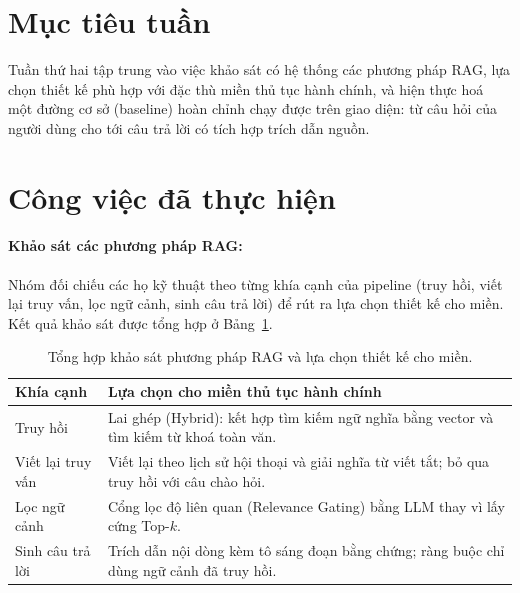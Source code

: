 \documentclass[11pt]{article}
\begin{document}

\section{Mục tiêu tuần}
Tuần thứ hai tập trung vào việc khảo sát có hệ thống các phương pháp RAG, lựa chọn thiết kế
phù hợp với đặc thù miền thủ tục hành chính, và hiện thực hoá một đường cơ sở (baseline) hoàn
chỉnh chạy được trên giao diện: từ câu hỏi của người dùng cho tới câu trả lời có tích hợp
trích dẫn nguồn.

\section{Công việc đã thực hiện}

\paragraph{Khảo sát các phương pháp RAG: }
Nhóm đối chiếu các họ kỹ thuật theo từng khía cạnh của pipeline (truy hồi, viết lại truy vấn,
lọc ngữ cảnh, sinh câu trả lời) để rút ra lựa chọn thiết kế cho miền. Kết quả khảo sát được
tổng hợp ở Bảng~\ref{tab:w2-survey}.

\begin{table}[H]
\centering\small
\renewcommand{\arraystretch}{1.25}
\begin{tabular}{@{}lp{8.4cm}@{}}
\toprule
Khía cạnh & Lựa chọn cho miền thủ tục hành chính \\
\midrule
Truy hồi & Lai ghép (Hybrid): kết hợp tìm kiếm ngữ nghĩa bằng vector và tìm kiếm từ khoá toàn văn. \\
Viết lại truy vấn & Viết lại theo lịch sử hội thoại và giải nghĩa từ viết tắt; bỏ qua truy hồi với câu chào hỏi. \\
Lọc ngữ cảnh & Cổng lọc độ liên quan (Relevance Gating) bằng LLM thay vì lấy cứng Top-$k$. \\
Sinh câu trả lời & Trích dẫn nội dòng kèm tô sáng đoạn bằng chứng; ràng buộc chỉ dùng ngữ cảnh đã truy hồi. \\
\bottomrule
\end{tabular}
\caption{Tổng hợp khảo sát phương pháp RAG và lựa chọn thiết kế cho miền.}
\label{tab:w2-survey}
\end{table}
\end{document}
